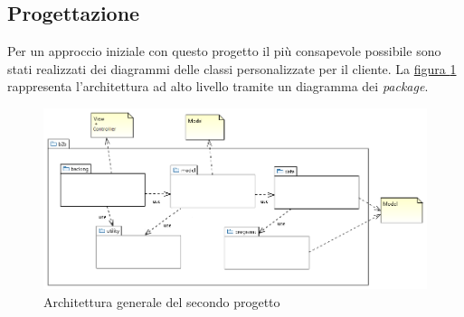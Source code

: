 \subsection{Progettazione}
Per un approccio iniziale con questo progetto il più consapevole possibile sono stati realizzati dei diagrammi delle classi personalizzate per il cliente. La \hyperref[fig:arch-p2]{figura \ref{fig:arch-p2}} rappresenta l'architettura ad alto livello tramite un diagramma dei \textit{package}.
\begin{figure}
	\centering
	\includegraphics[width=\linewidth]{Immagini/p2/architettura.png}
	\caption{Architettura generale del secondo progetto}
	\label{fig:arch-p2}
\end{figure}

